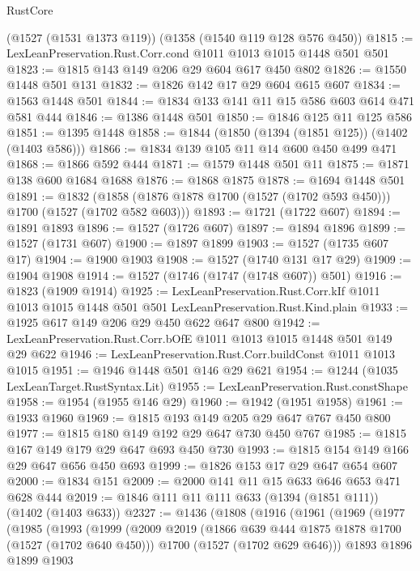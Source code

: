 \begin{lexlean}{RustCore}
\begin{coremodule}
    (@1527 (@1531 @1373 @119))
    (@1358 (@1540 @119 @128 @576 @450))
@1815 := LexLeanPreservation.Rust.Corr.cond @1011 @1013 @1015 @1448 @501 @501
@1823 := @1815 @143 @149 @206 @29 @604 @617 @450 @802
@1826 := @1550 @1448 @501 @131
@1832 := @1826 @142 @17 @29 @604 @615 @607
@1834 := @1563 @1448 @501
@1844 := @1834 @133 @141 @11 @15 @586 @603 @614 @471 @581 @444
@1846 := @1386 @1448 @501
@1850 := @1846 @125 @11 @125 @586
@1851 := @1395 @1448
@1858 := @1844 (@1850 (@1394 (@1851 @125)) (@1402 (@1403 @586)))
@1866 := @1834 @139 @105 @11 @14 @600 @450 @499 @471
@1868 := @1866 @592 @444
@1871 := @1579 @1448 @501 @11
@1875 := @1871 @138 @600 @1684 @1688
@1876 := @1868 @1875
@1878 := @1694 @1448 @501
@1891 := @1832 (@1858 (@1876 @1878 @1700 (@1527 (@1702 @593 @450))) @1700 (@1527 (@1702 @582 @603)))
@1893 := @1721 (@1722 @607)
@1894 := @1891 @1893
@1896 := @1527 (@1726 @607)
@1897 := @1894 @1896
@1899 := @1527 (@1731 @607)
@1900 := @1897 @1899
@1903 := @1527 (@1735 @607 @17)
@1904 := @1900 @1903
@1908 := @1527 (@1740 @131 @17 @29)
@1909 := @1904 @1908
@1914 := @1527 (@1746 (@1747 (@1748 @607)) @501)
@1916 := @1823 (@1909 @1914)
@1925 := LexLeanPreservation.Rust.Corr.kIf
    @1011
    @1013
    @1015
    @1448
    @501
    @501
    LexLeanPreservation.Rust.Kind.plain
@1933 := @1925 @617 @149 @206 @29 @450 @622 @647 @800
@1942 := LexLeanPreservation.Rust.Corr.bOfE @1011 @1013 @1015 @1448 @501 @149 @29 @622
@1946 := LexLeanPreservation.Rust.Corr.buildConst @1011 @1013 @1015
@1951 := @1946 @1448 @501 @146 @29 @621
@1954 := @1244 (@1035 LexLeanTarget.RustSyntax.Lit)
@1955 := LexLeanPreservation.Rust.constShape
@1958 := @1954 (@1955 @146 @29)
@1960 := @1942 (@1951 @1958)
@1961 := @1933 @1960
@1969 := @1815 @193 @149 @205 @29 @647 @767 @450 @800
@1977 := @1815 @180 @149 @192 @29 @647 @730 @450 @767
@1985 := @1815 @167 @149 @179 @29 @647 @693 @450 @730
@1993 := @1815 @154 @149 @166 @29 @647 @656 @450 @693
@1999 := @1826 @153 @17 @29 @647 @654 @607
@2000 := @1834 @151
@2009 := @2000 @141 @11 @15 @633 @646 @653 @471 @628 @444
@2019 := @1846 @111 @11 @111 @633 (@1394 (@1851 @111)) (@1402 (@1403 @633))
@2327 := @1436
    (@1808
      (@1916
        (@1961
          (@1969
            (@1977
              (@1985
                (@1993
                  (@1999
                    (@2009
                      @2019
                      (@1866 @639 @444 @1875 @1878 @1700 (@1527 (@1702 @640 @450)))
                      @1700
                      (@1527 (@1702 @629 @646)))
                    @1893
                    @1896
                    @1899
                    @1903

\end{coremodule}
\end{lexlean}
